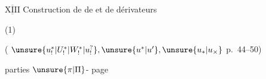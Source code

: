 

\(\underline{\overline{\mathrm{XIII}}}\) Construction de  de  et de dérivateurs

(1)

( $\unsure{u^{\ast}_{!}|U^{\ast}_{!}|W^{\ast}_{!}|u^{?}_{!}},\unsure{u^{\ast}|u'},\unsure{u_{\ast}|u_{\times}}$ p.~44--50)

 parties $\unsure{\pi|\Pi}$- page 


